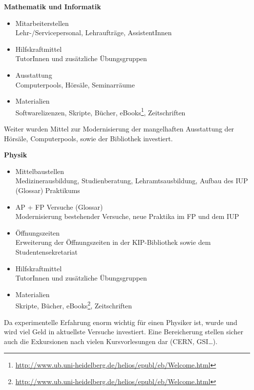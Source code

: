 \vspace{5mm}
\textbf{Mathematik und Informatik}
\begin{itemize}
 \item {Mitarbeiterstellen}\\Lehr-/Servicepersonal, Lehraufträge, AssistentInnen
\item {Hilfskraftmittel}\\ TutorInnen und zusätzliche Übungsgruppen
\item {Ausstattung}\\ Computerpools, Hörsäle, Seminarräume
\item {Materialien}\\ Softwarelizenzen, Skripte, Bücher, eBooks\footnote{\url{http://www.ub.uni-heidelberg.de/helios/epubl/eb/Welcome.html}}, Zeitschriften
\end{itemize}

Weiter wurden Mittel zur Modernisierung der mangelhaften Ausstattung der Hörsäle,
Computerpools, sowie der Bibliothek investiert.

\vspace{5mm}
\textbf{Physik}
\begin{itemize}
\item {Mittelbaustellen}\\Medizinerausbildung, Studienberatung, Lehramtsausbildung, Aufbau des IUP (Glossar) Praktikums
\item {AP + FP Versuche (Glossar)}\\Modernisierung bestehender Versuche, neue
Praktika im FP und dem IUP
\item {Öffnungszeiten}\\Erweiterung der Öffnungszeiten in der \gls{KIP}-Bibliothek sowie dem Studentensekretariat
\item {Hilfskraftmittel}\\ TutorInnen und zusätzliche Übungsgruppen
\item {Materialien}\\Skripte, Bücher, eBooks\footnote{\url{http://www.ub.uni-heidelberg.de/helios/epubl/eb/Welcome.html}}, Zeitschriften
\end{itemize}

Da experimentelle Erfahrung enorm wichtig für einen Physiker ist, wurde und wird
viel Geld in aktuellste Versuche investiert. Eine Bereicherung stellen sicher auch
die Exkursionen nach vielen Kursvorlesungen dar (CERN, GSI\dots).


